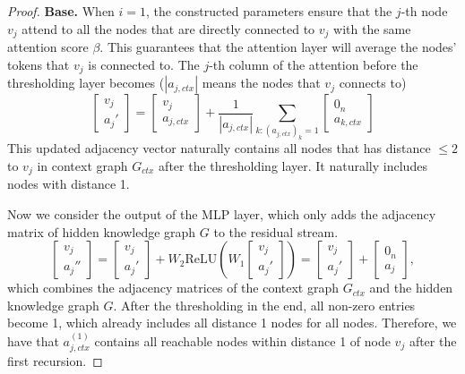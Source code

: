 \documentclass[]{bytedance_seed}
\newcommand{\1}{\mathbf{1}}
\begin{document}
{\begin{proof}
    \textbf{Base.} When $i=1$, the constructed parameters ensure that the $j$-th node $v_j$ attend to all the nodes that are directly connected to $v_j$ with the same attention score $\beta$. This guarantees that the attention layer will average the nodes' tokens that $v_j$ is connected to. The $j$-th column of the attention before the thresholding layer becomes ($|a_{j,ctx}|$ means the nodes that $v_j$ connects to)
    $$\begin{bmatrix}
        v_j\\
        a_{j}'
    \end{bmatrix}=\begin{bmatrix}
        v_j\\
        a_{j,ctx}
    \end{bmatrix}+\frac{1}{|a_{j,ctx}|}\sum_{k:(a_{j,ctx})_k=1}\begin{bmatrix}
        0_n\\
        a_{k,ctx}
    \end{bmatrix}$$
    This updated adjacency vector naturally contains all nodes that has distance $\le 2$ to $v_j$ in context graph $G_{ctx}$ after the thresholding layer. It naturally includes nodes with distance 1.

    Now we consider the output of the MLP layer, which only adds the adjacency matrix of hidden knowledge graph $G$ to the residual stream.
    $$\begin{bmatrix}
        v_j\\
        a_{j}''
    \end{bmatrix}=\begin{bmatrix}
        v_j\\
        a_{j}'
    \end{bmatrix}+W_2\mathrm{ReLU}\left(W_1\begin{bmatrix}
        v_j\\
        a_{j}'
    \end{bmatrix}\right)=\begin{bmatrix}
        v_j\\
        a_{j}'
    \end{bmatrix}+\begin{bmatrix}
        0_n\\
        a_{j}
    \end{bmatrix},$$
which combines the adjacency matrices of the context graph $G_{ctx}$ and the hidden knowledge graph $G$. After the thresholding in the end, all non-zero entries become 1, which already includes all distance 1 nodes for all nodes. Therefore, we have that $a_{j,ctx}^{(1)}$ contains all reachable nodes within distance 1 of node $v_j$ after the first recursion.


\end{proof}}
\end{document}
